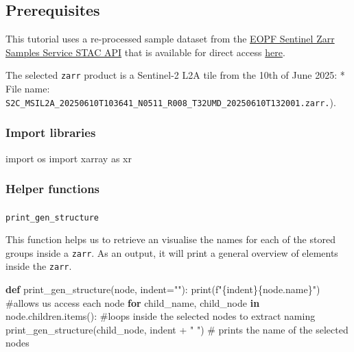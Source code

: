 \documentclass[
  letterpaper,
  DIV=11,
  numbers=noendperiod]{scrreprt}
\makeatletter
\let\oldparagraph\paragraph
\renewcommand{\paragraph}{
    \@ifstar
      \xxxParagraphStar
      \xxxParagraphNoStar
  }
\newcommand{\xxxParagraphStar}[1]{\oldparagraph*{#1}\mbox{}}
\newcommand{\xxxParagraphNoStar}[1]{\oldparagraph{#1}\mbox{}}
\newenvironment{Shaded}{\begin{snugshade}}{\end{snugshade}}
\newcommand{\BuiltInTok}[1]{\textcolor[rgb]{0.00,0.23,0.31}{#1}}
\newcommand{\CommentTok}[1]{\textcolor[rgb]{0.37,0.37,0.37}{#1}}
\newcommand{\ControlFlowTok}[1]{\textcolor[rgb]{0.00,0.23,0.31}{\textbf{#1}}}
\newcommand{\ImportTok}[1]{\textcolor[rgb]{0.00,0.46,0.62}{#1}}
\newcommand{\KeywordTok}[1]{\textcolor[rgb]{0.00,0.23,0.31}{\textbf{#1}}}
\newcommand{\NormalTok}[1]{\textcolor[rgb]{0.00,0.23,0.31}{#1}}
\newcommand{\OperatorTok}[1]{\textcolor[rgb]{0.37,0.37,0.37}{#1}}
\newcommand{\SpecialCharTok}[1]{\textcolor[rgb]{0.37,0.37,0.37}{#1}}
\newcommand{\SpecialStringTok}[1]{\textcolor[rgb]{0.13,0.47,0.30}{#1}}
\newcommand{\StringTok}[1]{\textcolor[rgb]{0.13,0.47,0.30}{#1}}
\makeatother
\begin{document}
\subsection{Prerequisites}\label{prerequisites}

This tutorial uses a re-processed sample dataset from the
\href{https://stac.browser.user.eopf.eodc.eu/}{EOPF Sentinel Zarr
Samples Service STAC API} that is available for direct access
\href{https://objects.eodc.eu/e05ab01a9d56408d82ac32d69a5aae2a:202506-s02msil2a/10/products/cpm_v256/S2C_MSIL2A_20250610T103641_N0511_R008_T32UMD_20250610T132001.zarr}{here}.

The selected \texttt{zarr} product is a Sentinel-2 L2A tile from the
10th of June 2025: * File name:
\texttt{S2C\_MSIL2A\_20250610T103641\_N0511\_R008\_T32UMD\_20250610T132001.zarr.}).

\subsubsection{Import libraries}\label{import-libraries}

\begin{Shaded}
\begin{Highlighting}[]
\ImportTok{import}\NormalTok{ os}
\ImportTok{import}\NormalTok{ xarray }\ImportTok{as}\NormalTok{ xr}
\end{Highlighting}
\end{Shaded}

\subsubsection{Helper functions}\label{helper-functions}

\paragraph{\texorpdfstring{\texttt{print\_gen\_structure}}{print\_gen\_structure}}\label{print_gen_structure}

This function helps us to retrieve an visualise the names for each of
the stored groups inside a \texttt{zarr}. As an output, it will print a
general overview of elements inside the \texttt{zarr}.

\begin{Shaded}
\begin{Highlighting}[]
\KeywordTok{def}\NormalTok{ print\_gen\_structure(node, indent}\OperatorTok{=}\StringTok{""}\NormalTok{):}
    \BuiltInTok{print}\NormalTok{(}\SpecialStringTok{f"}\SpecialCharTok{\{}\NormalTok{indent}\SpecialCharTok{\}\{}\NormalTok{node}\SpecialCharTok{.}\NormalTok{name}\SpecialCharTok{\}}\SpecialStringTok{"}\NormalTok{)     }\CommentTok{\#allows us access each node}
    \ControlFlowTok{for}\NormalTok{ child\_name, child\_node }\KeywordTok{in}\NormalTok{ node.children.items(): }\CommentTok{\#loops inside the selected nodes to extract naming}
\NormalTok{        print\_gen\_structure(child\_node, indent }\OperatorTok{+} \StringTok{"  "}\NormalTok{) }\CommentTok{\# prints the name of the selected nodes}
\end{Highlighting}
\end{Shaded}
\end{document}
